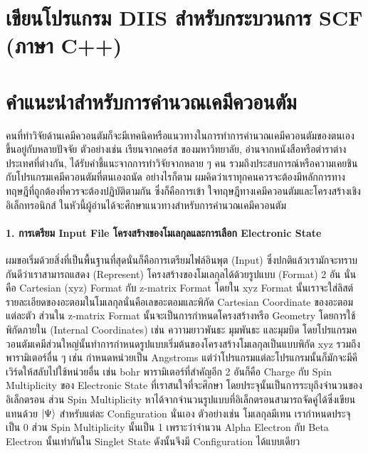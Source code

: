 \section{เขียนโปรแกรม DIIS สำหรับกระบวนการ SCF (ภาษา C++)}

\section{คำแนะนำสำหรับการคำนวณเคมีควอนตัม}

คนที่ทำวิจัยด้านเคมีควอนตัมก็จะมีเทคนิคหรือแนวทางในการทำการคำนวณเคมีควอนตัมของตนเอง ขึ้นอยู่กับหลายปัจจัย ตัวอย่างเช่น เรียนจากคอร์ส%
ของมหาวิทยาลัย, อ่านจากหนังสือหรือตำราต่างประเทศที่ต่างกัน, ได้รับคำชี้แนะจากการทำวิจัยจากหลาย ๆ คน รวมถึงประสบการณ์หรือความเคยชิน%
กับโปรแกรมเคมีควอนตัมที่ตนเองถนัด อย่างไรก็ตาม ผมคิดว่าเราทุกคนควรจะต้องมีหลักการทางทฤษฎีที่ถูกต้องที่ควรจะต้องปฏิบัติตามกัน ซึ่งก็คือการเข้า%
ใจทฤษฎีทางเคมีควอนตัมและโครงสร้างเชิงอิเล็กทรอนิกส์ ในหัวนี้ผู้อ่านได้จะศึกษาแนวทางสำหรับการคำนวณเคมีควอนตัม

\paragraph{1. การเตรียม Input File โครงสร้างของโมเลกุลและการเลือก Electronic State}
ผมขอเริ่มด้วยสิ่งที่เป็นพื้นฐานที่สุดนั่นก็คือการเตรียมไฟล์อินพุต (Input) ซึ่งปกติแล้วเรามักจะทราบกันดีว่าเราสามารถแสดง (Represent)
โครงสร้างของโมเลกุลได้ด้วยรูปแบบ (Format) 2 อัน นั่นคือ Cartesian (xyz) Format กับ z-matrix Format โดยใน xyz Format
นั้นเราจะใส่ลิสต์รายละเอียดของอะตอมในโมเลกุลนั่นคือเลขอะตอมและพิกัด Cartesian Coordinate ของอะตอมแต่ละตัว ส่วนใน z-matrix
Format นั้นจะเป็นการกำหนดโครงสร้างหรือ Geometry โดยการใช้พิกัดภายใน (Internal Coordinates) เช่น ควาามยาวพันธะ มุมพันธะ
และมุมบิด โดยโปรแกรมควอนตัมเคมีส่วนใหญ่นั้นทำการกำหนดรูปแบบเริ่มต้นของโครงสร้างโมเลกุลเป็นแบบพิกัด xyz รวมถึงพารามิเตอร์อื่น ๆ
เช่น กำหนดหน่วยเป็น Angstroms แต่ว่าโปรแกรมแต่ละโปรแกรมนั้นก็มักจะมีคีเวิร์ดให้สลับไปใช้หน่วยอื่น เช่น bohr พารามิเตอร์ที่สำคัญอีก 2
อันก็คือ Charge กับ Spin Multiplicity ของ Electronic State ที่เราสนใจที่จะศึกษา โดยประจุนั้นเป็นการระบุถึงจำนวนของอิเล็กตรอน
ส่วน Spin Multiplicity หาได้จากจำนวนรูปแบบที่อิเล็กตรอนสามารถจัดคู่ได้ซึ่งเขียนแทนด้วย $\ket{\Psi}$ สำหรับแต่ละ Configuration
นั่นเอง ตัวอย่างเช่น โมเลกุลมีเทน  เรากำหนดประจุเป็น 0 ส่วน Spin Multiplicity นั้นเป็น 1 เพราะว่าจำนวน Alpha Electron
กับ Beta Electron นั้นเท่ากันใน Singlet State ดังนั้นจึงมี Configuration ได้แบบเดียว

